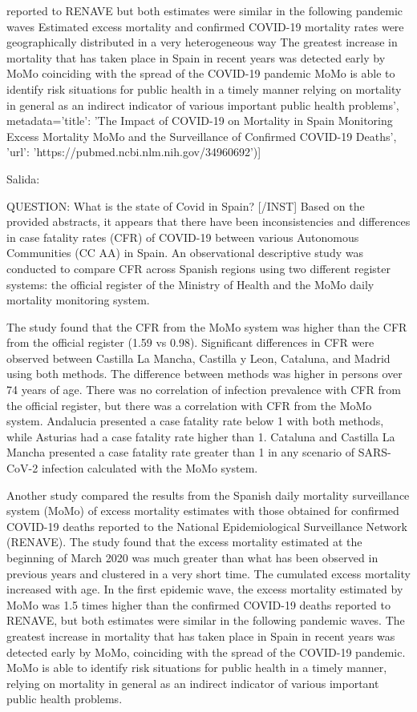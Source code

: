 reported to RENAVE but both estimates were similar in the following pandemic waves Estimated excess mortality and confirmed COVID-19 mortality rates were geographically distributed in a very heterogeneous way The greatest increase in mortality that has taken place in Spain in recent years was detected early by MoMo coinciding with the spread of the COVID-19 pandemic MoMo is able to identify risk situations for public health in a timely manner relying on mortality in general as an indirect indicator of various important public health problems', metadata={'title': 'The Impact of COVID-19 on Mortality in Spain Monitoring Excess Mortality MoMo and the Surveillance of Confirmed COVID-19 Deaths', 'url': 'https://pubmed.ncbi.nlm.nih.gov/34960692'})]

Salida:

QUESTION:
What is the state of Covid in Spain? [/INST]
Based on the provided abstracts, it appears that there have been inconsistencies and differences in case fatality rates (CFR) of COVID-19 between various Autonomous Communities (CC AA) in Spain. An observational descriptive study was conducted to compare CFR across Spanish regions using two different register systems: the official register of the Ministry of Health and the MoMo daily mortality monitoring system.

The study found that the CFR from the MoMo system was higher than the CFR from the official register (1.59 vs 0.98). Significant differences in CFR were observed between Castilla La Mancha, Castilla y Leon, Cataluna, and Madrid using both methods. The difference between methods was higher in persons over 74 years of age. There was no correlation of infection prevalence with CFR from the official register, but there was a correlation with CFR from the MoMo system. Andalucia presented a case fatality rate below 1 with both methods, while Asturias had a case fatality rate higher than 1. Cataluna and Castilla La Mancha presented a case fatality rate greater than 1 in any scenario of SARS-CoV-2 infection calculated with the MoMo system.

Another study compared the results from the Spanish daily mortality surveillance system (MoMo) of excess mortality estimates with those obtained for confirmed COVID-19 deaths reported to the National Epidemiological Surveillance Network (RENAVE). The study found that the excess mortality estimated at the beginning of March 2020 was much greater than what has been observed in previous years and clustered in a very short time. The cumulated excess mortality increased with age. In the first epidemic wave, the excess mortality estimated by MoMo was 1.5 times higher than the confirmed COVID-19 deaths reported to RENAVE, but both estimates were similar in the following pandemic waves. The greatest increase in mortality that has taken place in Spain in recent years was detected early by MoMo, coinciding with the spread of the COVID-19 pandemic. MoMo is able to identify risk situations for public health in a timely manner, relying on mortality in general as an indirect indicator of various important public health problems.

